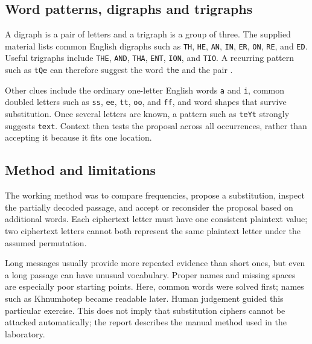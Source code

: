\subsection{Word patterns, digraphs and trigraphs}
A digraph is a pair of letters and a trigraph is a group of three. The supplied material lists common English digraphs such as \texttt{TH}, \texttt{HE}, \texttt{AN}, \texttt{IN}, \texttt{ER}, \texttt{ON}, \texttt{RE}, and \texttt{ED}. Useful trigraphs include \texttt{THE}, \texttt{AND}, \texttt{THA}, \texttt{ENT}, \texttt{ION}, and \texttt{TIO}. A recurring pattern such as \texttt{tQe} can therefore suggest the word \texttt{the} and the pair .

Other clues include the ordinary one-letter English words \texttt{a} and \texttt{i}, common doubled letters such as \texttt{ss}, \texttt{ee}, \texttt{tt}, \texttt{oo}, and \texttt{ff}, and word shapes that survive substitution. Once several letters are known, a pattern such as \texttt{teYt} strongly suggests \texttt{text}. Context then tests the proposal across all occurrences, rather than accepting it because it fits one location.

\subsection{Method and limitations}
The working method was to compare frequencies, propose a substitution, inspect the partially decoded passage, and accept or reconsider the proposal based on additional words. Each ciphertext letter must have one consistent plaintext value; two ciphertext letters cannot both represent the same plaintext letter under the assumed permutation.

Long messages usually provide more repeated evidence than short ones, but even a long passage can have unusual vocabulary. Proper names and missing spaces are especially poor starting points. Here, common words were solved first; names such as Khnumhotep became readable later. Human judgement guided this particular exercise. This does not imply that substitution ciphers cannot be attacked automatically; the report describes the manual method used in the laboratory.
